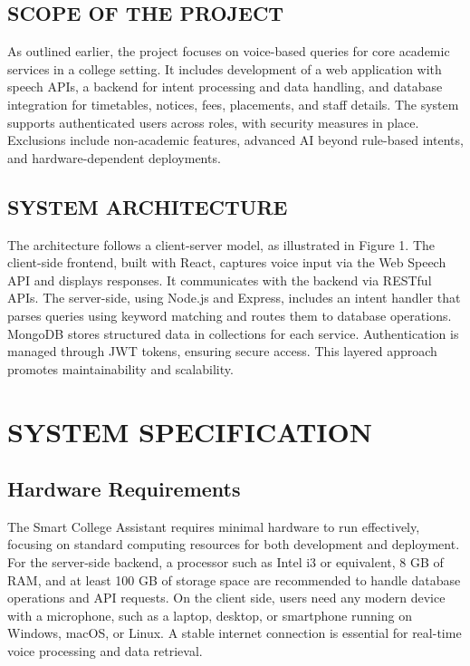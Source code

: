 \documentclass{article}
\begin{document}
\subsection{SCOPE OF THE PROJECT}
As outlined earlier, the project focuses on voice-based queries for core academic services in a college setting. It includes development of a web application with speech APIs, a backend for intent processing and data handling, and database integration for timetables, notices, fees, placements, and staff details. The system supports authenticated users across roles, with security measures in place. Exclusions include non-academic features, advanced AI beyond rule-based intents, and hardware-dependent deployments.

\subsection{SYSTEM ARCHITECTURE}
The architecture follows a client-server model, as illustrated in Figure 1. The client-side frontend, built with React, captures voice input via the Web Speech API and displays responses. It communicates with the backend via RESTful APIs. The server-side, using Node.js and Express, includes an intent handler that parses queries using keyword matching and routes them to database operations. MongoDB stores structured data in collections for each service. Authentication is managed through JWT tokens, ensuring secure access. This layered approach promotes maintainability and scalability.

\section{SYSTEM SPECIFICATION}

\subsection{Hardware Requirements}
The Smart College Assistant requires minimal hardware to run effectively, focusing on standard computing resources for both development and deployment. For the server-side backend, a processor such as Intel i3 or equivalent, 8 GB of RAM, and at least 100 GB of storage space are recommended to handle database operations and API requests. On the client side, users need any modern device with a microphone, such as a laptop, desktop, or smartphone running on Windows, macOS, or Linux. A stable internet connection is essential for real-time voice processing and data retrieval.
\end{document}
